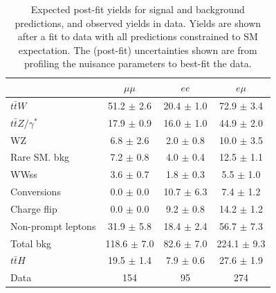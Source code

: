 \begin{table}[htbp]
  \begin{center}
    \caption[Signal region post-fit event yields by lepton flavor]{Expected post-fit yields 
      for signal and background predictions, and observed yields in data. Yields
      are shown after a fit to data with all predictions constrained to SM expectation.
      The (post-fit) uncertainties shown are from profiling the nuisance parameters to best-fit the data.}
    \begin{tabular}{l c c c} \hline
      & $\mu\mu$ & $ee$ & $e\mu$  \\ \hline 
      $t\bar{t}W$ & 51.2 $\pm$ 2.6 & 20.4 $\pm$ 1.0 & 72.9 $\pm$ 3.4 \\
      $t\bar{t}Z/\gamma^{*}$ & 17.9 $\pm$ 0.9 & 16.0 $\pm$ 1.0 & 44.9 $\pm$ 2.0 \\
      \hline
      WZ & 6.8 $\pm$ 2.6 & 2.0 $\pm$ 0.8 & 10.0 $\pm$ 3.5 \\
      Rare SM. bkg & 7.2 $\pm$ 0.8 & 4.0 $\pm$ 0.4 & 12.5 $\pm$ 1.1 \\
      WWss & 3.6 $\pm$ 0.7 & 1.8 $\pm$ 0.3 & 5.5 $\pm$ 1.0 \\
      \hline
      Conversions & 0.0 $\pm$ 0.0 & 10.7 $\pm$ 6.3 & 7.4 $\pm$ 1.2 \\
      Charge flip & 0.0 $\pm$ 0.0 & 9.2 $\pm$ 0.8 & 14.2 $\pm$ 1.2 \\
      Non-prompt leptons & 31.9 $\pm$ 5.8 & 18.4 $\pm$ 2.4 & 56.7 $\pm$ 7.3 \\
      \hline
      Total bkg & 118.6 $\pm$ 7.0 & 82.6 $\pm$ 7.0 & 224.1 $\pm$ 9.3 \\
      \hline
      $t\bar{t}H$ & 19.5 $\pm$ 1.4 & 7.9 $\pm$ 0.6 & 27.6 $\pm$ 1.9 \\
      \hline
      Data & 154 & 95 & 274 \\
      \hline
    \end{tabular}
    \label{tab:postfit_yields}
  \end{center}
\end{table}

